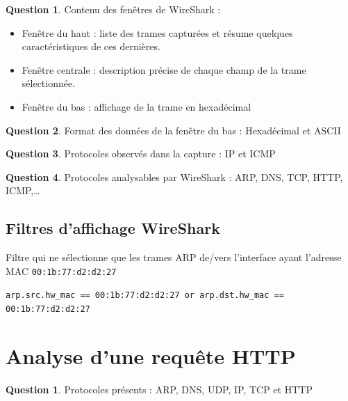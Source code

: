 \documentclass[11pt,english,french]{scrreprt}
\theoremstyle{remark}
\theoremstyle{definition}
\newtheorem{ques}{Question}[section]
\newtheorem{ques*}{Question}[subsection]
\begin{document}
\begin{ques*}
	Contenu des fenêtres de WireShark : \begin{itemize}
		\item Fenêtre du haut : liste des trames capturées et résume quelques caractéristiques de ces dernières.
		\item Fenêtre centrale : description précise de chaque champ de la trame sélectionnée.
		\item Fenêtre du bas : affichage de la trame en hexadécimal
	\end{itemize}
\end{ques*}

\begin{ques*}
	Format des données de la fenêtre du bas : Hexadécimal et ASCII
\end{ques*}

\begin{ques*}
	Protocoles observés dans la capture : IP et ICMP
\end{ques*}

\begin{ques*}
	Protocoles analysables par WireShark : ARP, DNS, TCP, HTTP,	ICMP,\dots
\end{ques*}

\subsection{Filtres d'affichage WireShark} %

Filtre qui ne sélectionne que les trames ARP de/vers l'interface ayant l'adresse MAC \lstinline!00:1b:77:d2:d2:27!

\lstinline!arp.src.hw_mac == 00:1b:77:d2:d2:27 or arp.dst.hw_mac == 00:1b:77:d2:d2:27!

\section{ Analyse d'une requête HTTP} %

\begin{ques}
	Protocoles présents : ARP, DNS, UDP, IP, TCP et HTTP
\end{ques}
\end{document}
